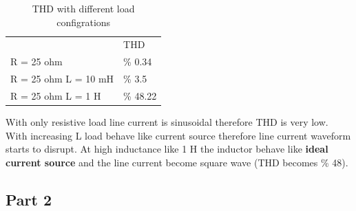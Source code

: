 \documentclass[fleqn, a4paper]{article}
\begin{document}
\begin{table}[H]
\centering
\begin{tabular}{ll}
                      & THD      \\
R = 25 ohm            & \% 0.34  \\
R = 25 ohm L  = 10 mH & \% 3.5   \\
R = 25 ohm L = 1 H    & \% 48.22
\end{tabular}
\caption{THD with different load configrations}
\end{table} 

With only resistive load line current is sinusoidal therefore THD is very low. With increasing L load behave like current source therefore line current waveform starts to disrupt. At high inductance like 1 H the inductor behave like \textbf{ideal current source} and the line current become square wave (THD becomes \% 48). 
\subsection*{Part 2}
\end{document}
